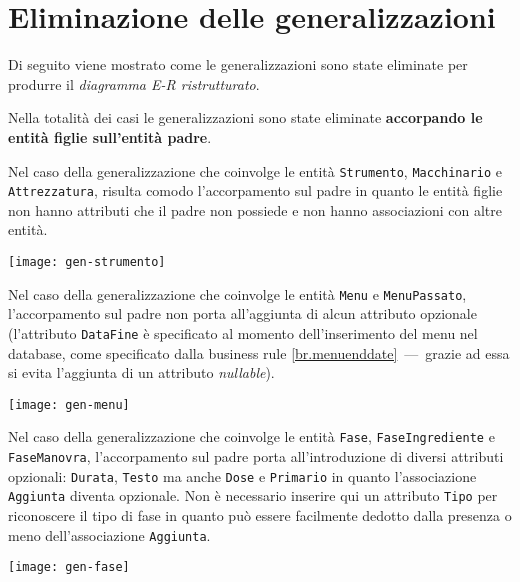 \section{Eliminazione delle generalizzazioni}\label{sec:generalizations}
Di seguito viene mostrato come le generalizzazioni sono state eliminate per produrre
il {\it diagramma E-R ristrutturato}.

Nella totalità dei casi le generalizzazioni sono state eliminate {\bf accorpando
le entità figlie sull'entità padre}.

\vspace{15pt}

Nel caso della generalizzazione che coinvolge le entità {\tt Strumento}, {\tt Macchinario}
e {\tt Attrezzatura}, risulta comodo l'accorpamento sul padre in quanto le entità figlie
non hanno attributi che il padre non possiede e non hanno associazioni con altre entità.

\vspace{5pt}\centerline{\texttt{[image: gen-strumento]}}

\vspace{15pt}

Nel caso della generalizzazione che coinvolge le entità {\tt Menu} e  {\tt MenuPassato},
l'accorpamento sul padre non porta all'aggiunta di alcun attributo opzionale (l'attributo
{\tt DataFine} è specificato al momento dell'inserimento del menu nel database, come specificato dalla business
rule \ref{br.menuenddate}~---~grazie ad essa si evita l'aggiunta di un attributo {\it nullable}).

\vspace{5pt}\centerline{\texttt{[image: gen-menu]}}

\vspace{15pt}

Nel caso della generalizzazione che coinvolge le entità {\tt Fase}, {\tt FaseIngrediente}
e {\tt FaseManovra}, l'accorpamento sul padre porta all'introduzione di diversi attributi
opzionali: {\tt Durata}, {\tt Testo} ma anche {\tt Dose} e {\tt Primario} in quanto l'associazione
{\tt Aggiunta} diventa opzionale. Non è necessario inserire qui un attributo {\tt Tipo} per
riconoscere il tipo di fase in quanto può essere facilmente dedotto dalla presenza o meno
dell'associazione {\tt Aggiunta}.

\vspace{5pt}\centerline{\texttt{[image: gen-fase]}}

\vspace{15pt}

